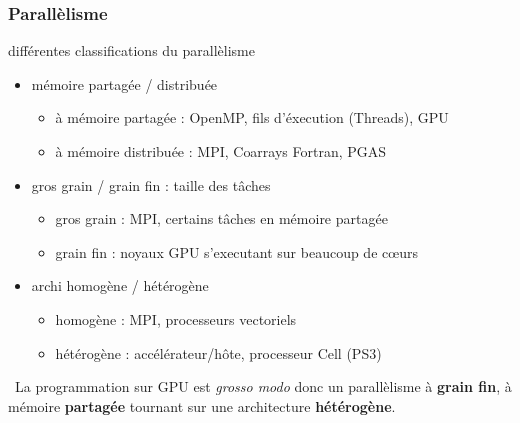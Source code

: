 \documentclass[11pt,mathserif]{beamer}
\newcommand{\gezi}{\faHandORight\ }
\begin{document}
\begin{frame}
\frametitle{Parallèlisme}
\pause
différentes classifications du parallèlisme
\begin{itemize}[<+->]
  \item mémoire partagée / distribuée
    \begin{itemize}
      \item à mémoire partagée : OpenMP, fils d'éxecution (Threads), GPU 
      \item à mémoire distribuée : MPI, Coarrays Fortran, PGAS
    \end{itemize}
 \item gros grain / grain fin : taille des tâches
   \begin{itemize}
     \item gros grain : MPI, certains tâches en mémoire partagée
     \item grain fin : noyaux GPU s'executant sur beaucoup de cœurs
   \end{itemize}
 \item archi homogène / hétérogène 
   \begin{itemize}
     \item homogène : MPI, processeurs vectoriels
     \item hétérogène : accélérateur/hôte, processeur Cell (PS3)
   \end{itemize}
\end{itemize}
\pause
  \gezi La programmation sur GPU est {\it grosso modo } donc un parallèlisme à {\bf grain fin}, à mémoire {\bf partagée} tournant sur
  une architecture {\bf hétérogène}.
\end{frame}
\end{document}
